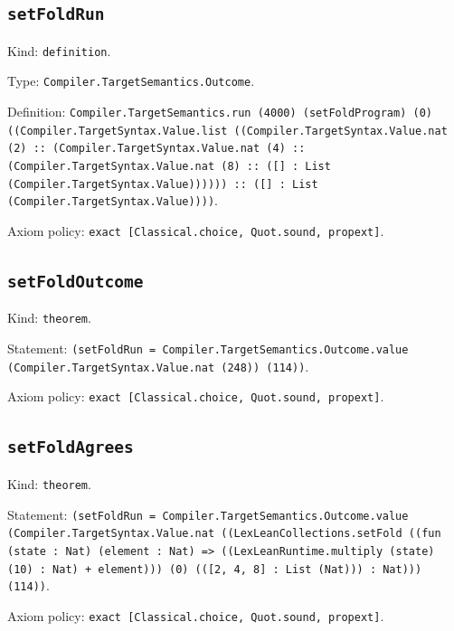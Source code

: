 \documentclass[11pt]{article}
\begin{document}
\subsection*{\texttt{setFoldRun}}
\noindent Kind: \texttt{definition}.\par
\noindent Type: \texttt{Compiler.TargetSemantics.Outcome}.\par
\noindent Definition: \texttt{Compiler.TargetSemantics.run (4000) (setFoldProgram) (0) ((Compiler.TargetSyntax.Value.list ((Compiler.TargetSyntax.Value.nat (2) :: (Compiler.TargetSyntax.Value.nat (4) :: (Compiler.TargetSyntax.Value.nat (8) :: ([] : List (Compiler.TargetSyntax.Value)))))) :: ([] : List (Compiler.TargetSyntax.Value))))}.\par
\noindent Axiom policy: \texttt{exact [Classical.choice, Quot.sound, propext]}.\par
\subsection*{\texttt{setFoldOutcome}}
\noindent Kind: \texttt{theorem}.\par
\noindent Statement: \texttt{(setFoldRun = Compiler.TargetSemantics.Outcome.value (Compiler.TargetSyntax.Value.nat (248)) (114))}.\par
\noindent Axiom policy: \texttt{exact [Classical.choice, Quot.sound, propext]}.\par
\subsection*{\texttt{setFoldAgrees}}
\noindent Kind: \texttt{theorem}.\par
\noindent Statement: \texttt{(setFoldRun = Compiler.TargetSemantics.Outcome.value (Compiler.TargetSyntax.Value.nat ((LexLeanCollections.setFold ((fun (state : Nat) (element : Nat) => ((LexLeanRuntime.multiply (state) (10) : Nat) + element))) (0) (([2, 4, 8] : List (Nat))) : Nat))) (114))}.\par
\noindent Axiom policy: \texttt{exact [Classical.choice, Quot.sound, propext]}.\par
\end{document}
